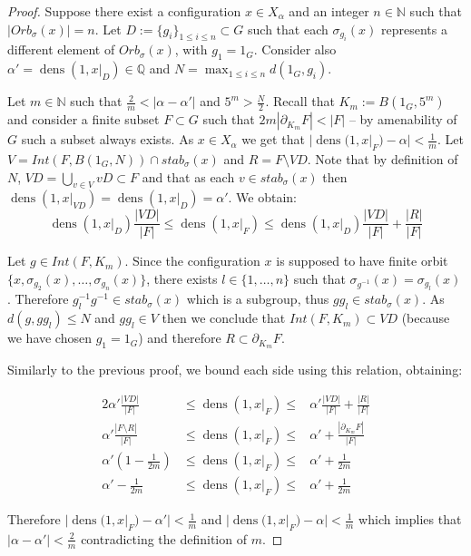 \documentclass[letterpaper]{article}
\theoremstyle{plain}
\def\NN{\mathbb{N}}
\def\dens{\operatorname{dens}}
\begin{document}
	\begin{proof}
		Suppose there exist a configuration $x \in X_{\alpha}$ and an integer $n \in \NN$ such that $|Orb_{\sigma}(x)| = n$. Let $D := \{g_i\}_{1 \leq i \leq n} \subset G$ such that each $\sigma_{g_i}(x)$ represents a different element of $Orb_{\sigma}(x)$, with $g_1 = 1_G$. Consider also $\alpha' = \dens(1,x|_D) \in \mathbb{Q}$ and $N = \max_{1 \leq i \leq n}{d(1_G,g_i)}$. 
				
		
		Let $m \in \NN$ such that $\frac{2}{m} < |\alpha - \alpha'|$ and $ 5^m > \frac{N}{2}$. Recall that $K_m := B(1_G,5^m)$ and consider a finite subset $F \subset G$ such that $2m|\partial_{K_m}F|<|F|$ -- by amenability of $G$ such a subset always exists. As $x \in X_{\alpha}$ we get that $|\dens(1,x|_F)-\alpha|<\frac{1}{m}$. Let $V = Int(F,B(1_G,N)) \cap stab_{\sigma}(x)$ and $R = F \setminus VD$. Note that by definition of $N$, $VD = \bigcup_{v \in V}vD \subset F$ and that as each $v \in stab_{\sigma}(x)$ then $\dens(1,x|_{VD}) = \dens(1,x|_D) = \alpha'$. We obtain: $$\dens(1,x|_D)\frac{|VD|}{|F|} \leq \dens(1,x|_F) \leq \dens(1,x|_D)\frac{|VD|}{|F|}+\frac{|R|}{|F|}$$
		
		Let $g \in Int(F,K_m)$. Since the configuration $x$ is supposed to have finite orbit $\{x,\sigma_{g_2}(x),\dots,\sigma_{g_n}(x)\}$, there exists $l \in \{1,\dots,n\}$ such that $\sigma_{g^{-1}}(x) = \sigma_{g_{l}}(x)$. Therefore $g_l^{-1}g^{-1} \in stab_{\sigma}(x)$ which is a subgroup, thus $gg_{l} \in stab_{\sigma}(x)$. As $d(g,gg_{l}) \leq N$ and $gg_{l} \in V$ then we conclude that $Int(F,K_m) \subset VD$ (because we have chosen $g_1=1_G$) and therefore $R \subset \partial_{K_m}F$.
		
		Similarly to the previous proof, we bound each side using this relation, obtaining:
		
		\begin{alignat*}{2}
			\alpha'\frac{|VD|}{|F|}  &\leq \dens(1,x|_F) \leq &\alpha'\frac{|VD|}{|F|}+\frac{|R|}{|F|} \\
			\alpha'\frac{|F \setminus R|}{|F|}  &\leq \dens(1,x|_F) \leq & \alpha'+\frac{|\partial_{K_m}F|}{|F|} \\
			\alpha'(1-\frac{1}{2m})  &\leq \dens(1,x|_F) \leq & \alpha'+\frac{1}{2m} \\
			\alpha' -\frac{1}{2m}  &\leq \dens(1,x|_F) \leq & \alpha'+\frac{1}{2m} 
		\end{alignat*}
		
		Therefore $|\dens(1,x|_F)-\alpha'|<\frac{1}{m}$ and $|\dens(1,x|_F)-\alpha|<\frac{1}{m}$ which implies that $|\alpha - \alpha'| < \frac{2}{m}$ contradicting the definition of $m$.	 
	\end{proof}
	
\end{document}
